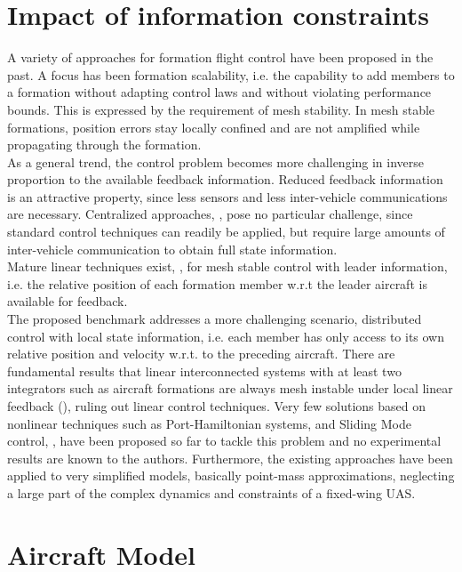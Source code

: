 \documentclass{ifacconf}
\begin{document}
\section{Impact of information constraints}
\label{sec:infoconstr}
A variety of approaches for formation flight control have been proposed in the past. A focus has been formation scalability, i.e. the capability to add members to a formation without adapting control laws and without violating performance bounds. This is expressed by the requirement of mesh stability. In mesh stable formations, position errors stay locally confined and are not amplified while propagating through the formation.\\
As a general trend, the control problem becomes more challenging in inverse proportion to the available feedback information. Reduced feedback information is an attractive property, since less sensors and less inter-vehicle communications are necessary.
Centralized approaches, \cite{nageli2014environment}, pose no particular challenge, since standard control techniques can readily be applied, but require large amounts of inter-vehicle communication to obtain full state information.\\
Mature linear techniques exist, \cite{shaw2007controller}, for mesh stable control with leader information, i.e. the relative position of each formation member w.r.t the leader aircraft is available for feedback.\\
The proposed benchmark addresses a more challenging scenario, distributed control with local state information, i.e. each member has only access to its own relative position and velocity w.r.t. to the preceding aircraft. 
There are fundamental results that linear interconnected systems with at least two integrators such as aircraft formations are always mesh instable under local linear feedback (\cite{Pant2001}), ruling out linear control techniques.
Very few solutions based on nonlinear techniques such as Port-Hamiltonian systems, \cite{Knorn2014} and Sliding Mode control, \cite{galzi2006uav,Bolting2016}, have been proposed so far to tackle this problem and no experimental results are known to the authors. Furthermore, the existing approaches have been applied to very simplified models, basically point-mass approximations, neglecting a large part of the complex dynamics and constraints of a fixed-wing UAS. 
\section{Aircraft Model}
\label{sec:model}
\end{document}
